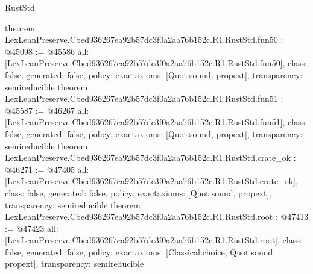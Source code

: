\begin{lexlean}{RustStd}
\begin{coremodule}
{}
theorem LexLeanPreserve.Cbed936267ea92b57dc3f0a2aa76b152c.R1.RustStd.fun50 : @45098 := @45586 {
  all: [LexLeanPreserve.Cbed936267ea92b57dc3f0a2aa76b152c.R1.RustStd.fun50],
  class: false,
  generated: false,
  policy: exact{axioms: [Quot.sound, propext]},
  transparency: semireducible
}
theorem LexLeanPreserve.Cbed936267ea92b57dc3f0a2aa76b152c.R1.RustStd.fun51 : @45587 := @46267 {
  all: [LexLeanPreserve.Cbed936267ea92b57dc3f0a2aa76b152c.R1.RustStd.fun51],
  class: false,
  generated: false,
  policy: exact{axioms: [Quot.sound, propext]},
  transparency: semireducible
}
theorem LexLeanPreserve.Cbed936267ea92b57dc3f0a2aa76b152c.R1.RustStd.crate_ok : @46271 := @47405 {
  all: [LexLeanPreserve.Cbed936267ea92b57dc3f0a2aa76b152c.R1.RustStd.crate_ok],
  class: false,
  generated: false,
  policy: exact{axioms: [Quot.sound, propext]},
  transparency: semireducible
}
theorem LexLeanPreserve.Cbed936267ea92b57dc3f0a2aa76b152c.R1.RustStd.root : @47413 := @47423 {
  all: [LexLeanPreserve.Cbed936267ea92b57dc3f0a2aa76b152c.R1.RustStd.root],
  class: false,
  generated: false,
  policy: exact{axioms: [Classical.choice, Quot.sound, propext]},
  transparency: semireducible
}


\end{coremodule}
\end{lexlean}
